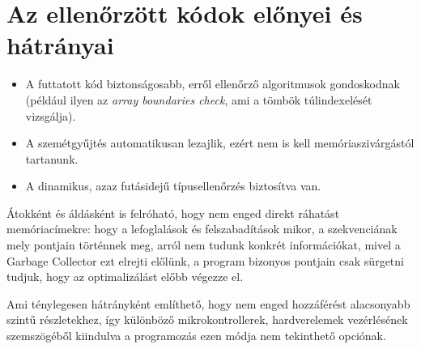 \documentclass[tocnopagenum]{thesis-ekf}
\theoremstyle{definition}
\theoremstyle{remark}
\begin{document}
	\section{Az ellenőrzött kódok előnyei és hátrányai}
	\begin{itemize}
		\item A futtatott kód biztonságosabb, erről ellenőrző algoritmusok gondoskodnak (például ilyen az \textit{array boundaries check}, ami a tömbök túlindexelését vizsgálja).
		\item A szemétgyűjtés automatikusan lezajlik, ezért nem is kell memóriaszivárgástól tartanunk.
		\item A dinamikus, azaz futásidejű típusellenőrzés biztosítva van.
	\end{itemize}
	
	Átokként és áldásként is felróható, hogy nem enged direkt ráhatást memóriacímekre: hogy a lefoglalások és felszabadítások mikor, a szekvenciának mely pontjain történnek meg, arról nem tudunk konkrét információkat, mivel a Garbage Collector ezt elrejti előlünk, a program bizonyos pontjain csak sürgetni tudjuk, hogy az optimalizálást előbb végezze el. 
	
	Ami ténylegesen hátrányként említhető, hogy nem enged hozzáférést alacsonyabb szintű részletekhez, így különböző mikrokontrollerek, hardverelemek vezérlésének szemszögéből kiindulva a programozás ezen módja nem tekinthető opciónak.
\end{document}
